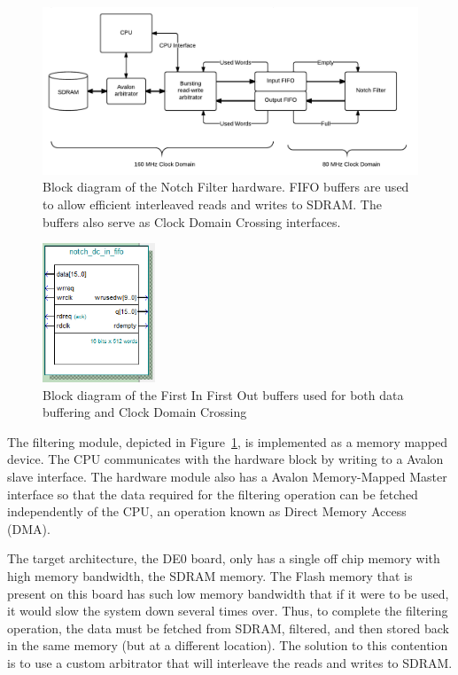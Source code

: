 \documentclass[]{article}
\begin{document}
\begin{figure}[htbp]
	\begin{center}
		\includegraphics[width = \textwidth]{DSDNotch.pdf}
	\end{center}
	\caption{Block diagram of the Notch Filter hardware. FIFO buffers are used to allow efficient interleaved reads and writes to SDRAM. The buffers also serve as Clock Domain Crossing interfaces.}
	\label{fig:DSDNotch}
\end{figure}

\begin{figure}[htbp]
	\begin{center}
		\includegraphics[width = 0.3\textwidth]{fifoBlock.PNG}
	\end{center}
	\caption{Block diagram of the First In First Out buffers used for both data buffering and Clock Domain Crossing}
	\label{fig:fifoblock}
\end{figure}

The filtering module, depicted in Figure~\ref{fig:DSDNotch}, is implemented as a memory mapped device. The CPU communicates with the hardware block by writing to a Avalon slave interface.
The hardware module also has a Avalon Memory-Mapped Master interface so that the data required for the filtering operation can be fetched independently of the CPU, an operation known as Direct Memory Access (DMA).

The target architecture, the DE0 board, only has a single off chip memory with high memory bandwidth, the SDRAM memory. The Flash memory that is present on this board has such low memory bandwidth that if it were to be used, it would slow the system down several times over.
Thus, to complete the filtering operation, the data must be fetched from SDRAM, filtered, and then stored back in the same memory (but at a different location). The solution to this contention is to use a custom arbitrator that will interleave the reads and writes to SDRAM.
\end{document}
